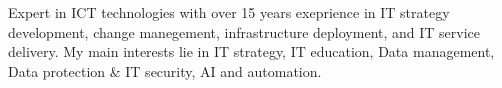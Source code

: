 

\begin{cvparagraph}

Expert in ICT technologies with over 15 years exeprience in IT strategy development, change manegement, infrastructure deployment, and IT service delivery. My main interests lie in IT strategy, IT education, Data management, Data protection \& IT security, AI and automation. 
\end{cvparagraph}
